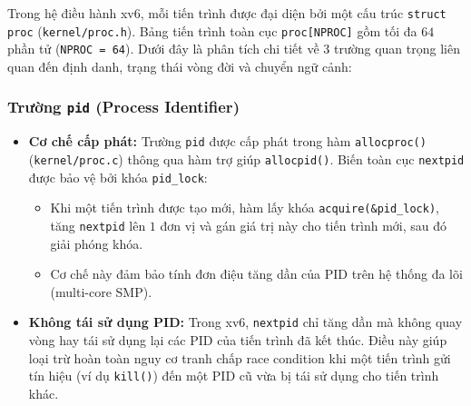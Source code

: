 Trong hệ điều hành xv6, mỗi tiến trình được đại diện bởi một cấu trúc \texttt{struct proc} (\texttt{kernel/proc.h}). Bảng tiến trình toàn cục \texttt{proc[NPROC]} gồm tối đa $64$ phần tử (\texttt{NPROC = 64}). Dưới đây là phân tích chi tiết về 3 trường quan trọng liên quan đến định danh, trạng thái vòng đời và chuyển ngữ cảnh:

\subsubsection{Trường \texttt{pid} (Process Identifier)}
\begin{itemize}
    \item \textbf{Cơ chế cấp phát:} Trường \texttt{pid} được cấp phát trong hàm \texttt{allocproc()} (\texttt{kernel/proc.c}) thông qua hàm trợ giúp \texttt{allocpid()}. Biến toàn cục \texttt{nextpid} được bảo vệ bởi khóa \texttt{pid\_lock}:
    \begin{itemize}
        \item Khi một tiến trình được tạo mới, hàm lấy khóa \texttt{acquire(\&pid\_lock)}, tăng \texttt{nextpid} lên $1$ đơn vị và gán giá trị này cho tiến trình mới, sau đó giải phóng khóa.
        \item Cơ chế này đảm bảo tính đơn điệu tăng dần của PID trên hệ thống đa lõi (multi-core SMP).
    \end{itemize}
    \item \textbf{Không tái sử dụng PID:} Trong xv6, \texttt{nextpid} chỉ tăng dần mà không quay vòng hay tái sử dụng lại các PID của tiến trình đã kết thúc. Điều này giúp loại trừ hoàn toàn nguy cơ tranh chấp race condition khi một tiến trình gửi tín hiệu (ví dụ \texttt{kill()}) đến một PID cũ vừa bị tái sử dụng cho tiến trình khác.
\end{itemize}

